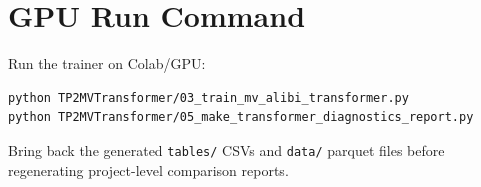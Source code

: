 \documentclass[11pt]{article}
\begin{document}
\section{GPU Run Command}
Run the trainer on Colab/GPU:
\begin{verbatim}
python TP2MVTransformer/03_train_mv_alibi_transformer.py
python TP2MVTransformer/05_make_transformer_diagnostics_report.py
\end{verbatim}

Bring back the generated \texttt{tables/} CSVs and \texttt{data/} parquet files before regenerating project-level comparison reports.
\end{document}
